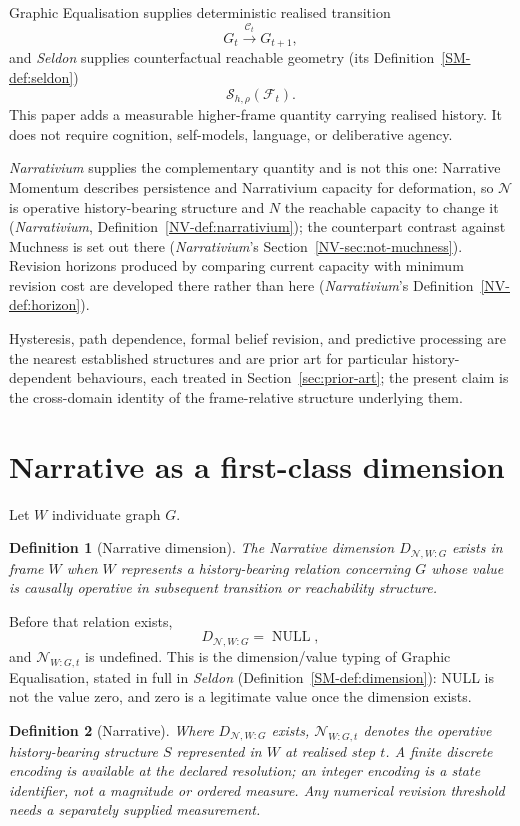 \documentclass[11pt,a4paper]{article}
\newtheorem{definition}{Definition}[section]
\theoremstyle{remark}
\newcommand{\Frame}{\mathcal F}
\newcommand{\Seldon}{\mathcal S}
\newcommand{\Narr}{\mathcal N}
\begin{document}
Graphic Equalisation supplies deterministic realised transition
\[
G_t\xrightarrow{\mathcal C_t}G_{t+1},
\]
and \emph{Seldon} supplies counterfactual reachable geometry (its Definition~\ref{SM-def:seldon})
\[
\Seldon_{h,\rho}(\Frame_t).
\]
This paper adds a measurable higher-frame quantity carrying realised history. It does not require cognition, self-models, language, or deliberative agency.

\emph{Narrativium} supplies the complementary quantity and is not this one: Narrative Momentum
describes persistence and Narrativium capacity for deformation, so $\Narr$ is operative
history-bearing structure and $N$ the reachable capacity to change it (\emph{Narrativium},
Definition~\ref{NV-def:narrativium}); the counterpart contrast against Muchness is set out there
(\emph{Narrativium}'s Section~\ref{NV-sec:not-muchness}). Revision horizons produced by comparing
current capacity with minimum revision cost are developed there rather than here
(\emph{Narrativium}'s Definition~\ref{NV-def:horizon}).

Hysteresis, path dependence, formal belief revision, and predictive processing are the nearest established structures and are prior art for particular history-dependent behaviours, each treated in Section~\ref{sec:prior-art}; the present claim is the cross-domain identity of the frame-relative structure underlying them.

\section{Narrative as a first-class dimension}\label{sec:narrative}
Let $W$ individuate graph $G$.

\begin{definition}[Narrative dimension]\label{def:narrative-dimension}
The Narrative dimension $D_{\Narr,W:G}$ exists in frame $W$ when $W$ represents a history-bearing relation concerning $G$ whose value is causally operative in subsequent transition or reachability structure.
\end{definition}

Before that relation exists,
\[
D_{\Narr,W:G}=\operatorname{NULL},
\]
and $\Narr_{W:G,t}$ is undefined. This is the dimension/value typing of Graphic Equalisation, stated in full in \emph{Seldon} (Definition~\ref{SM-def:dimension}): NULL is not the value zero, and zero is a legitimate value once the dimension exists.

\begin{definition}[Narrative]\label{def:narrative}
Where $D_{\Narr,W:G}$ exists, $\Narr_{W:G,t}$ denotes the operative
history-bearing structure $S$ represented in $W$ at realised step $t$.
A finite discrete encoding is available at the declared resolution; an
integer encoding is a state identifier, not a magnitude or ordered measure.
Any numerical revision threshold needs a separately supplied measurement.
\end{definition}
\end{document}
